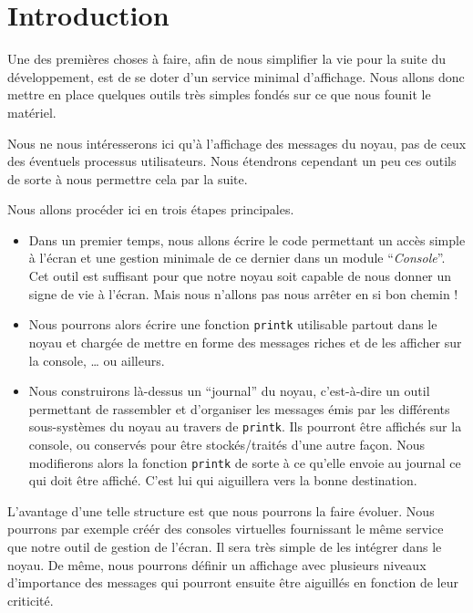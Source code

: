 \section{Introduction}

   Une des premières choses à faire, afin de nous simplifier la vie
pour la suite du développement, est de se doter d'un service minimal
d'affichage. Nous allons donc mettre en place quelques outils très
simples fondés sur ce que nous founit le matériel.

   Nous ne nous intéresserons ici qu'à l'affichage des messages du
noyau, pas de ceux des éventuels processus utilisateurs. Nous
étendrons cependant un peu ces outils de sorte à nous permettre cela
par la suite.

   Nous allons procéder ici en trois étapes principales.

\begin{itemize}
   \item   Dans un premier temps, nous allons écrire le code
permettant un accès simple à l'écran et une gestion minimale de ce
dernier dans un module ``{\em Console}''. Cet outil est suffisant pour
que notre noyau soit capable de nous donner un signe de vie à
l'écran. Mais nous n'allons pas nous arrêter en si bon chemin !

   \item Nous pourrons alors écrire une fonction \lstinline!printk!
utilisable partout dans le noyau et chargée de mettre en forme des
messages riches et de les afficher sur la console,  \ldots{} ou ailleurs.

   \item   Nous construirons là-dessus un ``journal'' du noyau, c'est-à-dire
un outil permettant de rassembler et d'organiser les messages émis par
les différents sous-systèmes du noyau au travers de {\tt printk}.
Ils pourront être affichés sur la console, ou conservés pour être
stockés/traités d'une autre façon.
   Nous modifierons alors la fonction {\tt printk} de sorte à ce qu'elle
envoie au journal ce qui doit être affiché. C'est lui qui aiguillera
vers la bonne destination.

\end{itemize}

   L'avantage d'une telle structure est que nous pourrons la faire
évoluer. Nous pourrons par exemple créér des consoles virtuelles
fournissant le même service que notre outil de gestion de l'écran. Il
sera très simple de les intégrer dans le noyau. De même, nous pourrons
définir un affichage avec plusieurs niveaux d'importance des messages
qui pourront ensuite être aiguillés en fonction de leur criticité.

